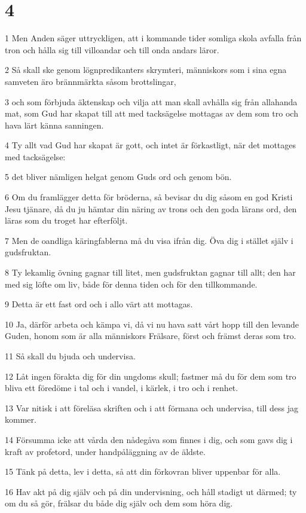 \chapter{4}

\par 1 Men Anden säger uttryckligen, att i kommande tider somliga skola avfalla från tron och hålla sig till villoandar och till onda andars läror.
\par 2 Så skall ske genom lögnpredikanters skrymteri, människors som i sina egna samveten äro brännmärkta såsom brottslingar,
\par 3 och som förbjuda äktenskap och vilja att man skall avhålla sig från allahanda mat, som Gud har skapat till att med tacksägelse mottagas av dem som tro och hava lärt känna sanningen.
\par 4 Ty allt vad Gud har skapat är gott, och intet är förkastligt, när det mottages med tacksägelse:
\par 5 det bliver nämligen helgat genom Guds ord och genom bön.
\par 6 Om du framlägger detta för bröderna, så bevisar du dig såsom en god Kristi Jesu tjänare, då du ju hämtar din näring av trons och den goda lärans ord, den läras som du troget har efterföljt.
\par 7 Men de oandliga käringfablerna må du visa ifrån dig. Öva dig i stället själv i gudsfruktan.
\par 8 Ty lekamlig övning gagnar till litet, men gudsfruktan gagnar till allt; den har med sig löfte om liv, både för denna tiden och för den tillkommande.
\par 9 Detta är ett fast ord och i allo värt att mottagas.
\par 10 Ja, därför arbeta och kämpa vi, då vi nu hava satt vårt hopp till den levande Guden, honom som är alla människors Frälsare, först och främst deras som tro.
\par 11 Så skall du bjuda och undervisa.
\par 12 Låt ingen förakta dig för din ungdoms skull; fastmer må du för dem som tro bliva ett föredöme i tal och i vandel, i kärlek, i tro och i renhet.
\par 13 Var nitisk i att föreläsa skriften och i att förmana och undervisa, till dess jag kommer.
\par 14 Försumma icke att vårda den nådegåva som finnes i dig, och som gavs dig i kraft av profetord, under handpåläggning av de äldste.
\par 15 Tänk på detta, lev i detta, så att din förkovran bliver uppenbar för alla.
\par 16 Hav akt på dig själv och på din undervisning, och håll stadigt ut därmed; ty om du så gör, frälsar du både dig själv och dem som höra dig.

